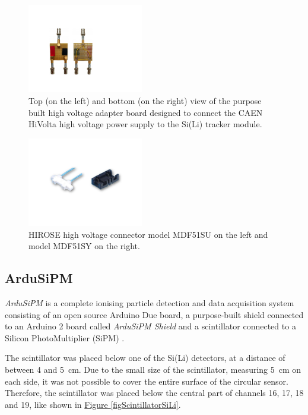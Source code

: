 \par


\begin{figure}[h!]
    \centering
    \includegraphics[width=0.45\textwidth]{Images/chap3/hivoltage_adapter_board.pdf}
    \caption{Top (on the left) and bottom (on the right) view of the purpose built high voltage adapter board designed to connect the CAEN HiVolta high voltage power supply to the Si(Li) tracker module.}
    \label{figHiVoltAdapterBoard}
\end{figure}

\begin{figure}[h!]
    \centering
    \includegraphics[width=0.45\textwidth]{Images/chap3/connectors_high_voltage.pdf}
    \caption{HIROSE high voltage connector model MDF51SU on the left and model MDF51SY on the right.}
    \label{figHVPSconn}
\end{figure}


\subsection{ArduSiPM}
\label{secArduSiPM}
\textit{ArduSiPM} is a complete ionising particle detection and data acquisition system consisting of an open source Arduino Due board, a purpose-built shield connected to an Arduino 2 board called \textit{ArduSiPM Shield} and a scintillator connected to a Silicon PhotoMultiplier (SiPM) \cite{bocci_2015_particle}. 

\par
The scintillator was placed below one of the Si(Li) detectors, at a distance of between 4 and \SI{5}{\cm}. Due to the small size of the scintillator, measuring \SI{5}{\cm} on each side, it was not possible to cover the entire surface of the circular sensor. Therefore, the scintillator was placed below the central part of channels 16, 17, 18 and 19, like shown in \hyperref[figScintillatorSiLi]{Figure \ref{figScintillatorSiLi}}.

